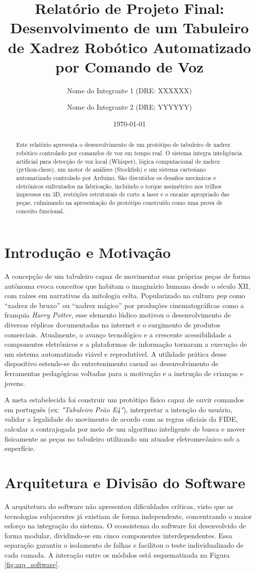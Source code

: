 \documentclass[11pt,a4paper]{article}
\title{Relatório de Projeto Final: Desenvolvimento de um Tabuleiro de Xadrez Robótico Automatizado por Comando de Voz}
\author{Nome do Integrante 1 (DRE: XXXXXX) \and Nome do Integrante 2 (DRE: YYYYYY)}
\date{\today}
\begin{document}
\maketitle

\begin{abstract}
Este relatório apresenta o desenvolvimento de um protótipo de tabuleiro de xadrez robótico controlado por comandos de voz em tempo real. O sistema integra inteligência artificial para detecção de voz local (Whisper), lógica computacional de xadrez (python-chess), um motor de análises (Stockfish) e um sistema cartesiano automatizado controlado por Arduino. São discutidos os desafios mecânicos e eletrônicos enfrentados na fabricação, incluindo o torque assimétrico nos trilhos impressos em 3D, restrições estruturais de corte a laser e o encaixe apropriado das peças, culminando na apresentação do protótipo construído como uma prova de conceito funcional.
\end{abstract}

\section{Introdução e Motivação}
A concepção de um tabuleiro capaz de movimentar suas próprias peças de forma autônoma evoca conceitos que habitam o imaginário humano desde o século XII, com raízes em narrativas da mitologia celta. Popularizado na cultura \textit{pop} como ``xadrez de bruxo'' ou ``xadrez mágico'' por produções cinematográficas como a franquia \textit{Harry Potter}, esse elemento lúdico motivou o desenvolvimento de diversas réplicas documentadas na internet e o surgimento de produtos comerciais. Atualmente, o avanço tecnológico e a crescente acessibilidade a componentes eletrônicos e a plataformas de informação tornaram a execução de um sistema automatizado viável e reprodutível. A utilidade prática desse dispositivo estende-se do entretenimento casual ao desenvolvimento de ferramentas pedagógicas voltadas para a motivação e a instrução de crianças e jovens.

A meta estabelecida foi construir um protótipo físico capaz de ouvir comandos em português (ex: \textit{"Tabuleiro Peão E4"}), interpretar a intenção do usuário, validar a legalidade do movimento de acordo com as regras oficiais da FIDE, calcular a contrajogada por meio de um algoritmo inteligente de busca e mover fisicamente as peças no tabuleiro utilizando um atuador eletromecânico sob a superfície. 

\section{Arquitetura e Divisão do Software}
A arquitetura do software não apresentou dificuldades críticas, visto que as tecnologias subjacentes já existiam de forma independente, concentrando o maior esforço na integração do sistema. O ecossistema do software foi desenvolvido de forma modular, dividindo-se em cinco componentes interdependentes. Essa separação garantiu o isolamento de falhas e facilitou o teste individualizado de cada camada. A interação entre os módulos está esquematizada na Figura \ref{fig:arq_software}.
\end{document}
